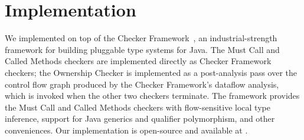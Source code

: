 \section{Implementation}
\label{sec:implementation}

We implemented \tool on top of the Checker Framework~\cite{PapiACPE2008},
an industrial-strength framework for building pluggable type systems
for Java. The Must Call and Called Methods checkers are implemented
directly as Checker Framework checkers; the Ownership Checker is
implemented as a post-analysis pass over the control flow graph
produced by the Checker Framework's dataflow analysis, which is invoked
when the other two checkers terminate. The framework provides the
Must Call and Called Methods checkers with flow-sensitive local type
inference, support for Java generics and qualifier polymorphism, and
other conveniences. Our implementation is open-source and available
at .
